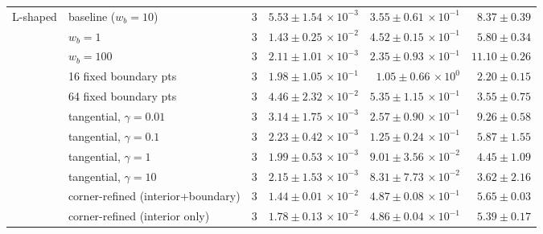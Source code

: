 \begin{tabular}{llrrrr}
\midrule
L-shaped & baseline ($w_b{=}10$) & 3 & $5.53\pm1.54\,\times\!10^{-3}$ & $3.55\pm0.61\,\times\!10^{-1}$ & $8.37\pm0.39$ \\
 & $w_b{=}1$ & 3 & $1.43\pm0.25\,\times\!10^{-2}$ & $4.52\pm0.15\,\times\!10^{-1}$ & $5.80\pm0.34$ \\
 & $w_b{=}100$ & 3 & $2.11\pm1.01\,\times\!10^{-3}$ & $2.35\pm0.93\,\times\!10^{-1}$ & $11.10\pm0.26$ \\
 & 16 fixed boundary pts & 3 & $1.98\pm1.05\,\times\!10^{-1}$ & $1.05\pm0.66\,\times\!10^{0}$ & $2.20\pm0.15$ \\
 & 64 fixed boundary pts & 3 & $4.46\pm2.32\,\times\!10^{-2}$ & $5.35\pm1.15\,\times\!10^{-1}$ & $3.55\pm0.75$ \\
 & tangential, $\gamma{=}0.01$ & 3 & $3.14\pm1.75\,\times\!10^{-3}$ & $2.57\pm0.90\,\times\!10^{-1}$ & $9.26\pm0.58$ \\
 & tangential, $\gamma{=}0.1$ & 3 & $2.23\pm0.42\,\times\!10^{-3}$ & $1.25\pm0.24\,\times\!10^{-1}$ & $5.87\pm1.55$ \\
 & tangential, $\gamma{=}1$ & 3 & $1.99\pm0.53\,\times\!10^{-3}$ & $9.01\pm3.56\,\times\!10^{-2}$ & $4.45\pm1.09$ \\
 & tangential, $\gamma{=}10$ & 3 & $2.15\pm1.53\,\times\!10^{-3}$ & $8.31\pm7.73\,\times\!10^{-2}$ & $3.62\pm2.16$ \\
 & corner-refined (interior+boundary) & 3 & $1.44\pm0.01\,\times\!10^{-2}$ & $4.87\pm0.08\,\times\!10^{-1}$ & $5.65\pm0.03$ \\
 & corner-refined (interior only) & 3 & $1.78\pm0.13\,\times\!10^{-2}$ & $4.86\pm0.04\,\times\!10^{-1}$ & $5.39\pm0.17$ \\
\bottomrule
\end{tabular}

